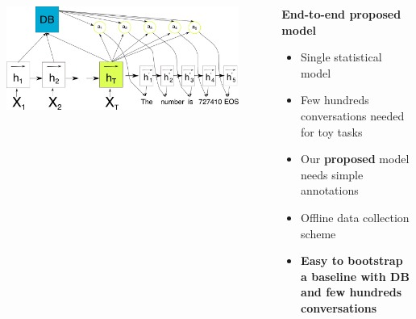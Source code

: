 \documentclass[10pt, compress,british,xcolor={svgnames,dvipsnames,x11names},trans]{beamer}
\begin{document}
\begin{frame}
\begin{columns}
\begin{column}{0.2\textwidth}
\begin{center}
            \includegraphics[width=0.9\textwidth]{./encdecdb.pdf} 
        \end{center}
\end{column}
\begin{column}{0.45\textwidth}
    {\bf End-to-end proposed model}
    \begin{itemize}
        \item Single statistical model
        \item Few hundreds conversations needed for toy tasks~\cite{wen_networkbased_2016}
        \item Our {\bf proposed} model needs simple annotations
        \item {\color{darkgreen} Offline data collection scheme}~\cite{wen_networkbased_2016,platek2016wochat}
        \item {\bf \color{darkgreen} Easy to bootstrap a baseline with DB and few hundreds conversations}
    \end{itemize}
\end{column}
\end{columns}
\end{frame}
\end{document}
